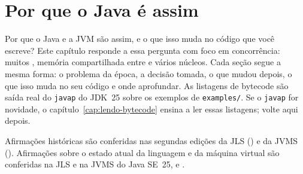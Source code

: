 \chapter{Por que o Java é assim}
\label{cap:por-que}

\proximasaulas

Por que o Java e a JVM são assim, e o que isso muda no código que você
escreve? Este capítulo responde a essa pergunta com foco em concorrência:
muitos , memória compartilhada entre
 e vários núcleos.
Cada seção segue a mesma forma: o problema da época, a decisão tomada, o
que mudou depois, o que isso muda no seu código e onde aprofundar.
As listagens de bytecode são saída real do \texttt{javap} do JDK~25
sobre os exemplos de \texttt{examples/}. Se o \texttt{javap} for
novidade, o capítulo~\ref{cap:lendo-bytecode} ensina a ler essas
listagens; volte aqui depois.

Afirmações históricas são conferidas nas segundas edições da JLS
() e da JVMS
(). Afirmações sobre o estado atual da
linguagem e da máquina virtual são conferidas na JLS e na JVMS do Java
SE~25,  e .










